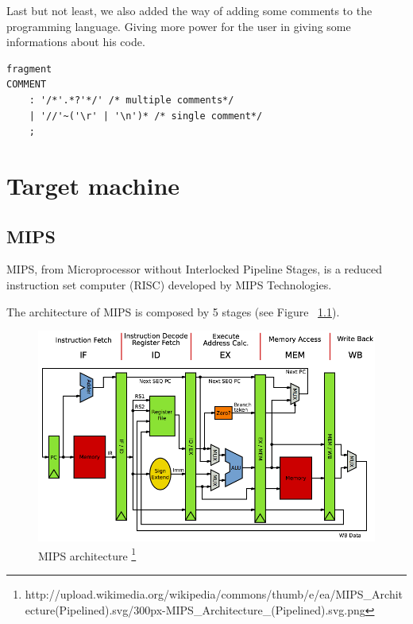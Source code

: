 \documentclass[
  oneside,
  11pt, a4paper,
  footinclude=true,
  headinclude=true,
  cleardoublepage=empty
]{scrbook}
\begin{document}
Last but not least, we also added the way of adding some comments to the programming language. Giving more power for the user in giving some informations about his code.

\begin{lstlisting}[caption={Rule comment},label={lst:comments_LISS}]
fragment
COMMENT
    : '/*'.*?'*/' /* multiple comments*/
    | '//'~('\r' | '\n')* /* single comment*/
    ;
\end{lstlisting}


\chapter{Target machine}


\section{MIPS}
MIPS, from Microprocessor without Interlocked Pipeline Stages, is a reduced instruction set computer (RISC) developed by MIPS Technologies. %


The architecture of MIPS is composed by 5 stages (see Figure ~\ref{fig:MIPSarchitecture}).

\begin{figure}[h!]
  \centering
    \includegraphics[width=1\textwidth]{img/MIPSarchitecture.png}
    \caption{MIPS architecture \protect\footnote{http://upload.wikimedia.org/wikipedia/commons/thumb/e/ea/MIPS\_Architecture(Pipelined).svg/300px-MIPS\_Architecture\_(Pipelined).svg.png}}
    \label{fig:MIPSarchitecture}
\end{figure}
\end{document}
